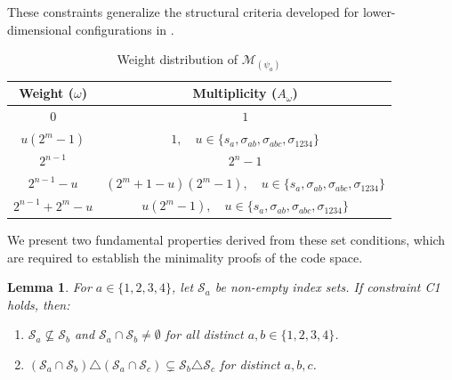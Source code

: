 \documentclass[pdflatex,sn-mathphys-num]{sn-jnl}%
\theoremstyle{thmstyleone}%
\newtheorem{lemma}{Lemma}
\theoremstyle{thmstyletwo}%
\theoremstyle{thmstylethree}%
\begin{document}
These constraints generalize the structural criteria developed for lower-dimensional configurations in \cite{LiuLiao2022}.

\begin{table}[h]
\centering
\caption{Weight distribution of $\mathcal{M}_{(\psi_a)}$}
\label{Table_2}
\begin{tabular}{|c|c|}
\hline
Weight ($\omega$) & Multiplicity ($A_\omega$) \\
\hline
$0$ & $1$ \\
\hline
$u(2^m-1)$ & $1, \quad u \in \{s_a, \sigma_{ab}, \sigma_{abc}, \sigma_{1234}\}$ \\
\hline
$2^{n-1}$ & $2^n-1$ \\
\hline
$2^{n-1}-u$ & $(2^m+1-u)(2^m-1), \quad u \in \{s_a, \sigma_{ab}, \sigma_{abc}, \sigma_{1234}\}$ \\
\hline
$2^{n-1}+2^m-u$ & $u(2^m-1), \quad u \in \{s_a, \sigma_{ab}, \sigma_{abc}, \sigma_{1234}\}$ \\
\hline
\end{tabular}
\end{table}

We present two fundamental properties derived from these set conditions, which are required to establish the minimality proofs of the code space.
\begin{lemma}\label{lem:set_theory}
For $a \in \{1,2,3,4\}$, let $\mathcal{S}_a$ be non-empty index sets. If constraint C1 holds, then:
\begin{enumerate}
    \item $\mathcal{S}_a \not\subseteq \mathcal{S}_b$ and $\mathcal{S}_a \cap \mathcal{S}_b \neq \emptyset$ for all distinct $a, b \in \{1,2,3,4\}$.
    \item $(\mathcal{S}_a \cap \mathcal{S}_b) \triangle (\mathcal{S}_a \cap \mathcal{S}_c) \subsetneq \mathcal{S}_b \triangle \mathcal{S}_c$ for distinct $a,b,c$.
\end{enumerate}
\end{lemma}
\end{document}
